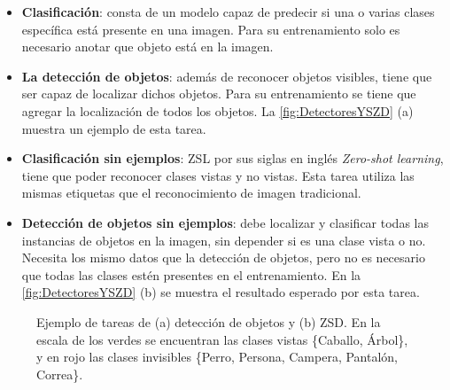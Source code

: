 \begin{itemize}
	\item \textbf{Clasificación}: consta de un modelo capaz de predecir si una o varias clases específica está presente en una imagen. Para su entrenamiento solo es necesario anotar que objeto está en la imagen.
	\item \textbf{La detección de objetos}: además de reconocer objetos visibles, tiene que ser capaz de localizar dichos objetos. Para su entrenamiento se tiene que agregar la localización de todos los objetos. La \autoref{fig:DetectoresYSZD} (a) muestra un ejemplo de esta tarea.
	\item \textbf{Clasificación sin ejemplos}: ZSL por sus siglas en inglés \textit{Zero-shot learning}, tiene que poder reconocer clases vistas y no vistas. Esta tarea utiliza las mismas etiquetas que el reconocimiento de imagen tradicional. 
	\item \textbf{Detección de objetos sin ejemplos}: debe localizar y clasificar todas las instancias de objetos en la imagen, sin depender si es una clase vista o no. Necesita los mismo datos que la detección de objetos, pero no es necesario que todas las clases estén presentes en el entrenamiento. En la \autoref{fig:DetectoresYSZD} (b) se muestra el resultado esperado por esta tarea.
\end{itemize}

\begin{figure}[]
	\centering
	\caption{Ejemplo de tareas de (a) detección de objetos y (b) ZSD. En la escala de los verdes se encuentran las clases vistas \{Caballo, Árbol\}, y en rojo las clases invisibles \{Perro, Persona, Campera, Pantalón, Correa\}.}
	\label{fig:DetectoresYSZD}
\end{figure}


